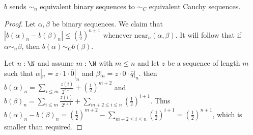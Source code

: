 \begin{lemma}
  $b$ sends $\sim_n$ equivalent binary sequences to $\sim_C$ equivalent Cauchy sequences. 
\end{lemma}
\begin{proof}
  Let $\alpha, \beta$ be binary sequences.
  We claim that $|b(\alpha)_n - b(\beta)_n| \leq (\frac12)^{n+1}$ 
  whenever $\text{near}_n(\alpha, \beta)$. 
  It will follow that if $\alpha\sim_n \beta$, then 
  $b(\alpha)\sim_C b(\beta)$. 

  Let $n:\N$ and assume $m:\N$ with $m\leq n$ and 
  let $z$ be a sequence of length $m$ such that 
  $\alpha|_n = z\cdot 1 \cdot \overline 0|_n$ and $\beta|_n = z \cdot 0 \cdot \overline q |_n$. 
  then $b(\alpha)_n = \sum_{i\leq m} \frac{z(i)}{2^{i+1}} + (\frac12)^{m+2}$ and 
  $b(\beta)_n = \sum_{i\leq m} \frac{z(i)}{2^{i+1}} + \sum\limits_{m+2 \leq i \leq n}(\frac12)^{i+1}$. 
  Thus 
  $b(\alpha)_n - b(\beta)_n = (\frac12)^{m+2} - \sum\limits_{m+2 \leq i \leq n}(\frac12)^{i+1} = 
  (\frac12)^{n+1}$, 
  which is smaller than required. 
\end{proof}  

